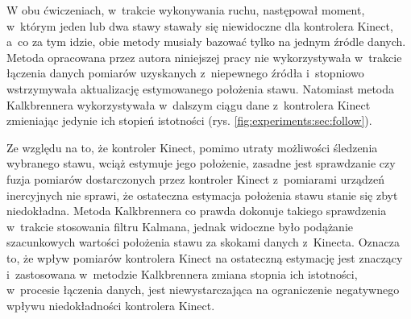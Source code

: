 W obu ćwiczeniach, w~trakcie wykonywania ruchu, następował moment, w~którym jeden lub dwa stawy stawały się niewidoczne dla kontrolera Kinect, a~co za tym idzie, obie metody musiały bazować tylko na jednym źródle danych. Metoda opracowana przez autora niniejszej pracy nie wykorzystywała  w~trakcie łączenia danych pomiarów uzyskanych z~niepewnego źródła i~stopniowo wstrzymywała aktualizację estymowanego położenia stawu. Natomiast metoda Kalkbrennera wykorzystywała w~dalszym ciągu dane z~kontrolera Kinect zmieniając jedynie ich stopień istotności (rys. \ref{fig:experiments:sec:follow}). 
														
Ze względu na to, że kontroler Kinect, pomimo utraty możliwości śledzenia wybranego stawu, wciąż estymuje jego położenie, zasadne jest sprawdzanie czy fuzja pomiarów dostarczonych przez kontroler Kinect z~pomiarami urządzeń inercyjnych nie sprawi, że ostateczna estymacja położenia stawu stanie się zbyt niedokładna. Metoda Kalkbrennera co prawda dokonuje takiego sprawdzenia w~trakcie stosowania filtru Kalmana, jednak widoczne było podążanie szacunkowych wartości położenia stawu za skokami danych z~Kinecta. Oznacza to, że wpływ pomiarów kontrolera Kinect na ostateczną estymację jest znaczący i~zastosowana w~metodzie Kalkbrennera zmiana stopnia ich istotności, w~procesie łączenia danych, jest niewystarczająca na ograniczenie negatywnego wpływu niedokładności kontrolera Kinect.
				

